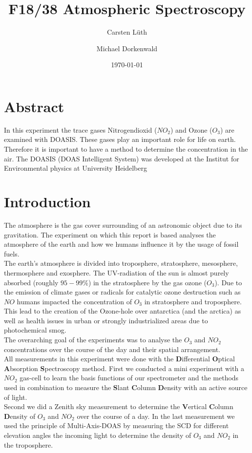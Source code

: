 \documentclass[12pt, english]{scrartcl} %
\title{F18/38 Atmospheric Spectroscopy}
\author{Carsten L{\"u}th \and Michael Dorkenwald}
\date{\today}
\begin{document}
\maketitle

\begin{multicols}{2}


\section{Abstract}
In this experiment the trace gases Nitrogendioxid ($NO_2$) and Ozone ($O_3$) are examined with DOASIS. These gases play an important role for life on earth. Therefore it is important to have a method to determine the concentration in the air. The DOASIS (DOAS Intelligent System) was developed at the Institut for Environmental physics at University Heidelberg
\section{Introduction}
The atmosphere is the gas cover surrounding of an astronomic object due to its gravitation. The experiment on which this report is based analyses the atmosphere of the earth and how we humans influence it by the usage of fossil fuels.\\
The earth's atmosphere is divided into troposphere, stratosphere, mesosphere, thermosphere and exosphere. The UV-radiation of the sun is almost purely absorbed (roughly $95-99\%$) in the stratosphere by the gas ozone ($O_3$). 
Due to the emission of climate gases or radicals for catalytic ozone destruction such as $NO$ humans impacted the concentration of $O_3$ in stratosphere and troposphere.\\  
This lead to the creation of the Ozone-hole over antarctica (and the arctica) as well as health issues in urban or strongly industrialized areas due to photochemical smog.\\
The overarching goal of the experiments was to analyse the $O_3$ and $NO_2$ concentrations over the course of the day and their spatial arrangement.\\
All measurements in this experiment were done with the \textbf{D}ifferential \textbf{O}ptical \textbf{A}bsorption \textbf{S}pectroscopy method. 
First we conducted a mini experiment with a $NO_2$ gas-cell to learn the basis functions of our spectrometer and the methods used in combination to measure the \textbf{S}lant \textbf{C}olumn \textbf{D}ensity with an active source of light.\\
Second we did a Zenith sky measurement to determine the \textbf{V}ertical \textbf{C}olumn \textbf{D}ensity of $O_3$ and $NO_2$ over the course of a day. 
In the last measurement we used the principle of Multi-Axis-DOAS by measuring the SCD for different elevation angles the incoming light to determine the density of $O_3$ and $NO_2$ in the troposphere.\\

\end{multicols}
\end{document}

